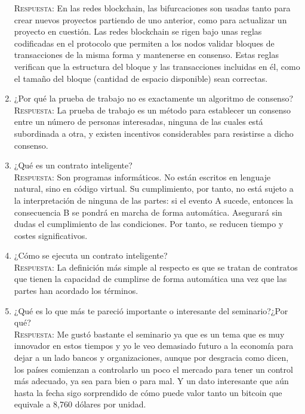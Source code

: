 \documentclass[letterpaper,10pt]{article}
\begin{document}
\begin{enumerate}
    \textsc{Respuesta:}
    En las redes blockchain, las bifurcaciones son usadas tanto para crear nuevos proyectos partiendo de uno anterior, como para actualizar un proyecto en cuestión.
Las redes blockchain se rigen bajo unas reglas codificadas en el protocolo que permiten a los nodos validar bloques de transacciones de la misma forma y mantenerse en consenso. Estas reglas verifican que la estructura del bloque y las transacciones incluidas en él, como el tamaño del bloque (cantidad de espacio disponible) sean correctas.
    \\
    
    \item ¿Por qué la prueba de trabajo no es exactamente un algoritmo de consenso? \\

    \textsc{Respuesta:}
    La prueba de trabajo es un método para establecer un consenso entre un número de personas interesadas, ninguna de las cuales está subordinada a otra, y existen incentivos considerables para resistirse a dicho consenso.
    \\
    
    \item ¿Qué es un contrato inteligente?\\

    \textsc{Respuesta:}
    Son programas informáticos. No están escritos en lenguaje natural, sino en código virtual. Su cumplimiento, por tanto, no está sujeto a la interpretación de ninguna de las partes: si el evento A sucede, entonces la consecuencia B se pondrá en marcha de forma automática. 
Asegurará sin dudas el cumplimiento de las condiciones. Por tanto, se reducen tiempo y costes significativos.
    \\
    
    \item  ¿Cómo se ejecuta un contrato inteligente?\\

    \textsc{Respuesta:}
    La definición más simple al respecto es que se tratan de contratos que tienen la capacidad de cumplirse de forma automática una vez que las partes han acordado los términos.
    \\
    
    \item ¿Qué es lo que más te pareció importante o interesante del seminario?¿Por qué?\\

    \textsc{Respuesta:}
    Me gustó bastante el seminario ya que es un tema que es muy innovador en estos tiempos y yo le veo demasiado futuro a la economía para dejar a un lado bancos y organizaciones, aunque por desgracia como dicen, los países comienzan a controlarlo un poco el mercado para tener un control más adecuado, ya sea para bien o para mal.
Y un dato interesante que aún hasta la fecha sigo sorprendido de cómo puede valor tanto un bitcoin que equivale a 8,760 dólares por unidad.
    \\
	\end{enumerate} 
\end{document}

